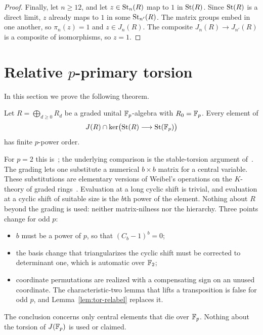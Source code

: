 \begin{proof}
Finally, let $n\geq12$, and let $z\in\operatorname{St}_n(R)$ map to $1$ in $\operatorname{St}(R)$. Since $\operatorname{St}(R)$ is a direct limit, $z$ already
maps to $1$ in some $\operatorname{St}_{n'}(R)$. The matrix groups embed in one another, so $\pi_n(z)=1$ and $z\in J_n(R)$. The
composite $J_n(R)\to J_{n'}(R)$ is a composite of isomorphisms, so $z=1$.
\end{proof}

\section{Relative \texorpdfstring{$p$}{p}-primary torsion}\label{sec:torsion}

In this section we prove the following theorem.

\begin{theorem}\label{thm:relative-torsion}
Let $R=\bigoplus_{d\geq0}R_d$ be a graded unital $\mathbb F_p$-algebra with $R_0=\mathbb F_p$. Every element of
\[
 J(R)\cap\ker\bigl(\operatorname{St}(R)\longrightarrow\operatorname{St}(\mathbb F_p)\bigr)
\]
has finite $p$-power order.
\end{theorem}

For $p=2$ this is~\cite[Proposition~4.5]{OAI247rf}; the underlying comparison is the stable-torsion argument
of~\cite[Lemmas~6.4--6.7 and Proposition~6.8]{OAI247periodic}. The grading lets one substitute a numerical $b\times b$
matrix for a central variable. These substitutions are elementary versions of Weibel's operations on the $K$-theory of
graded rings~\cite[Section~1]{Weibel1987}. Evaluation at a long cyclic shift is trivial, and evaluation at a cyclic shift
of suitable size is the $b$th power of the element. Nothing about $R$ beyond the grading is used: neither matrix-nilness
nor the hierarchy. Three points change for odd $p$:
\begin{itemize}[leftmargin=*]
\item $b$ must be a power of $p$, so that $(C_b-1)^b=0$;
\item the basis change that triangularizes the cyclic shift must be corrected to determinant one, which is automatic over
$\mathbb F_2$;
\item coordinate permutations are realized with a compensating sign on an unused coordinate. The characteristic-two lemma
that lifts a transposition is false for odd $p$, and Lemma~\ref{lem:tor-relabel} replaces it.
\end{itemize}
The conclusion concerns only central elements that die over $\mathbb F_p$. Nothing about the torsion of $J(\mathbb F_p)$ is used or
claimed.

